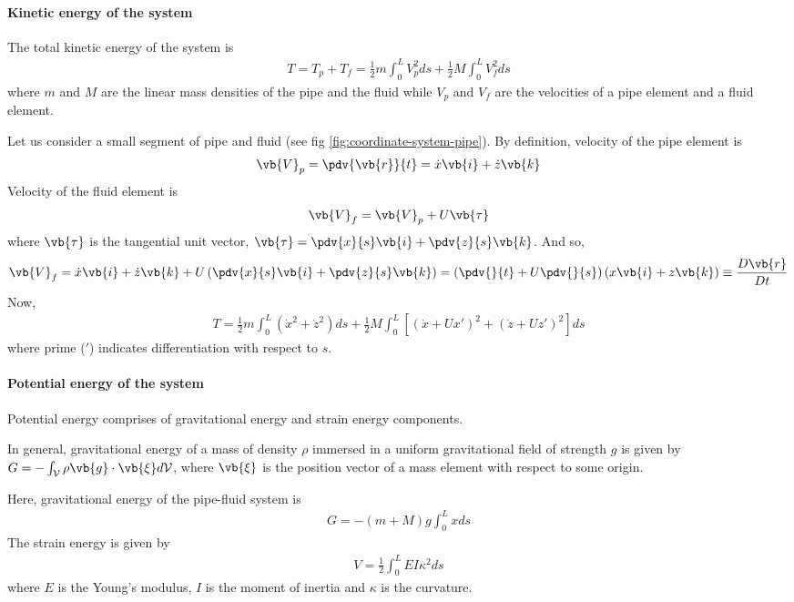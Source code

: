 \paragraph{Kinetic energy of the system} The total kinetic energy of the system is 
\begin{align}
   T = T_p + T_f = \frac{1}{2}m \int_0^L V_p^2 ds + \frac{1}{2}M \int_0^L V_f^2 ds
\end{align}
where $m$ and $M$ are the linear mass densities of the pipe and the fluid while $V_p$ and $V_f$ are the velocities of a pipe element and a fluid element.

Let us consider a small segment of pipe and fluid (see fig \ref{fig:coordinate-system-pipe}). By definition, velocity of the pipe element is
\begin{align*}
   \vb{V}_p = \pdv{\vb{r}}{t} = \dot{x}\vb{i} + \dot{z}\vb{k}
\end{align*}
Velocity of the fluid element is 
\begin{align*}
 \vb{V}_f = \vb{V}_p + U \vb{\tau}
\end{align*}
where $\vb{\tau}$ is the tangential unit vector, $\vb{\tau} = \pdv{x}{s} \vb{i} + \pdv{z}{s}\vb{k}$. And so, 
\begin{align*}
\vb{V}_f = \dot{x}\vb{i} + \dot{z}\vb{k} + U\left(\pdv{x}{s} \vb{i} + \pdv{z}{s}\vb{k}\right) = \left(\pdv{}{t} + U\pdv{}{s}\right)(x\vb{i} + z\vb{k}) \equiv \frac{D\vb{r}}{Dt}
\end{align*}
Now, 
\begin{align}
T = \frac{1}{2}m \int_0^L (\dot{x}^2 + \dot{z}^2) ds + \frac{1}{2}M \int_0^L [(\dot{x} + Ux')^2 + (\dot{z} + Uz')^2] ds \label{eqn:total-kinetic-energy}
\end{align}
where prime ($'$) indicates differentiation with respect to $s$.

\paragraph{Potential energy of the system} Potential energy comprises of gravitational energy and strain energy components.

In general, gravitational energy of a mass of density $\rho$ immersed in a uniform gravitational field of strength $g$ is given by $G = -\int_\mathcal{V} \rho\vb{g} \cdot \vb{\xi}d\mathcal{V}$, where $\vb{\xi}$ is the position vector of a mass element with respect to some origin.

Here, gravitational energy of the pipe-fluid system is
\begin{align}
 G = - (m + M)g\int_0^L x ds \label{eqn:gravitational-energy}
\end{align}
The strain energy is given by 
\begin{align}
  V = \frac{1}{2} \int_0^L EI \kappa^2 ds \label{eqn:strain-energy}
\end{align}
where $E$ is the Young's modulus, $I$ is the moment of inertia and $\kappa$ is the curvature.	

